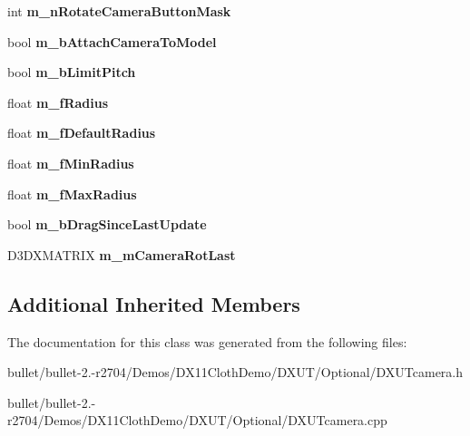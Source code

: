 \begin{DoxyCompactItemize}
\item 
\hypertarget{class_c_model_viewer_camera_a4bc7721e96a2d3380c5612c67f02101e}{int {\bfseries m\+\_\+n\+Rotate\+Camera\+Button\+Mask}}\label{class_c_model_viewer_camera_a4bc7721e96a2d3380c5612c67f02101e}

\item 
\hypertarget{class_c_model_viewer_camera_ac56eaab097df2ea4538f34fe1c9d7d49}{bool {\bfseries m\+\_\+b\+Attach\+Camera\+To\+Model}}\label{class_c_model_viewer_camera_ac56eaab097df2ea4538f34fe1c9d7d49}

\item 
\hypertarget{class_c_model_viewer_camera_aa33a42faf6ef232889e94c30246043a0}{bool {\bfseries m\+\_\+b\+Limit\+Pitch}}\label{class_c_model_viewer_camera_aa33a42faf6ef232889e94c30246043a0}

\item 
\hypertarget{class_c_model_viewer_camera_a5a8802fe2b98550e3f3ecfee32fc1f8e}{float {\bfseries m\+\_\+f\+Radius}}\label{class_c_model_viewer_camera_a5a8802fe2b98550e3f3ecfee32fc1f8e}

\item 
\hypertarget{class_c_model_viewer_camera_a122bcab6c9a503056de43140a730e511}{float {\bfseries m\+\_\+f\+Default\+Radius}}\label{class_c_model_viewer_camera_a122bcab6c9a503056de43140a730e511}

\item 
\hypertarget{class_c_model_viewer_camera_a7e9a0f1881fc1b7b3c31db3270d54e06}{float {\bfseries m\+\_\+f\+Min\+Radius}}\label{class_c_model_viewer_camera_a7e9a0f1881fc1b7b3c31db3270d54e06}

\item 
\hypertarget{class_c_model_viewer_camera_a9f414b154917b367fc6cc766fd2d7691}{float {\bfseries m\+\_\+f\+Max\+Radius}}\label{class_c_model_viewer_camera_a9f414b154917b367fc6cc766fd2d7691}

\item 
\hypertarget{class_c_model_viewer_camera_a6b6d1199533d68ab4168d9d6a306a9bb}{bool {\bfseries m\+\_\+b\+Drag\+Since\+Last\+Update}}\label{class_c_model_viewer_camera_a6b6d1199533d68ab4168d9d6a306a9bb}

\item 
\hypertarget{class_c_model_viewer_camera_a4beb0065dc8aca02d996b009caf82739}{D3\+D\+X\+M\+A\+T\+R\+I\+X {\bfseries m\+\_\+m\+Camera\+Rot\+Last}}\label{class_c_model_viewer_camera_a4beb0065dc8aca02d996b009caf82739}

\end{DoxyCompactItemize}
\subsection*{Additional Inherited Members}


The documentation for this class was generated from the following files\+:\begin{DoxyCompactItemize}
\item 
bullet/bullet-\/2.-\/r2704/\+Demos/\+D\+X11\+Cloth\+Demo/\+D\+X\+U\+T/\+Optional/D\+X\+U\+Tcamera.\+h\item 
bullet/bullet-\/2.-\/r2704/\+Demos/\+D\+X11\+Cloth\+Demo/\+D\+X\+U\+T/\+Optional/D\+X\+U\+Tcamera.\+cpp\end{DoxyCompactItemize}
